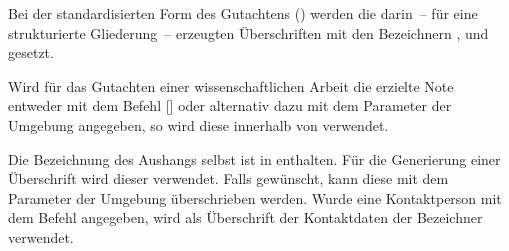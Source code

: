 \begin{Entity*}{}
\begin{Declaration}{}
\begin{Declaration}{}
\printdeclarationlist%
%
Bei der standardisierten Form des Gutachtens () werden 
die darin~-- für eine strukturierte Gliederung~-- erzeugten Überschriften mit 
den Bezeichnern ,  und  
gesetzt.
%
\end{Declaration}
\end{Declaration}

\begin{Declaration}{}
\printdeclarationlist%
%
Wird für das Gutachten einer wissenschaftlichen Arbeit die erzielte Note 
entweder mit dem Befehl [] oder alternativ dazu 
mit dem Parameter  der 
Umgebung  angegeben, so wird diese innerhalb von 
 verwendet.
%
\end{Declaration}

\begin{Declaration}{}
\begin{Declaration}[v2.02]{}
\printdeclarationlist%
%
Die Bezeichnung des Aushangs selbst ist in  enthalten. Für 
die Generierung einer Überschrift wird dieser verwendet. Falls gewünscht, kann 
diese mit dem Parameter  der Umgebung 
 überschrieben werden. Wurde eine Kontaktperson mit dem 
Befehl  angegeben, wird als Überschrift der Kontaktdaten 
der Bezeichner  verwendet.
%
\end{Declaration}
\end{Declaration}
%
\end{Entity*}
